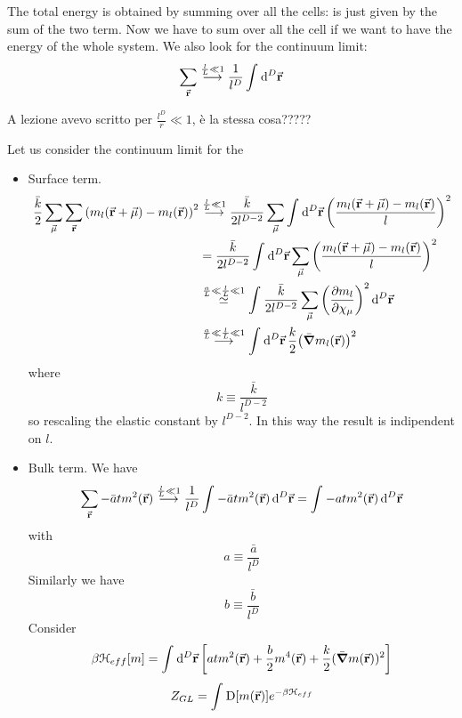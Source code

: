 \documentclass[../main/main.tex]{subfiles}
\begin{document}
The total energy is obtained  by summing over all the cells: is just given by the sum of the two term.
Now we have to sum over all the cell if we want to have the energy of the whole system.
We also look for the continuum limit:
\begin{equation}
  \sum_{\va{r}}^{}  \overset{\frac{l}{L} \ll 1}{\longrightarrow}   \frac{1}{l^D} \int_{}^{} \dd[D]{\va{r}}
\end{equation}
\begin{remark}
A lezione avevo scritto per \( \frac{l^D}{r} \ll 1 \), è la stessa cosa?????
\end{remark}
Let us consider the continuum limit for the
\begin{itemize}
\item Surface term.
\begin{equation}
\begin{split}
\frac{\bar{k} }{2} \sum_{\va{\mu }}^{} \sum_{\va{r}}^{}   \qty(m_l (\va{r}+\va{\mu }) - m_l(\va{r}))^2 &
\overset{\frac{l}{L} \ll 1}{\longrightarrow} \frac{\bar{k} }{2l^{D-2}} \sum_{\va{\mu }}^{} \int_{}^{} \dd[D]{\va{r}} \qty(\frac{m_l (\va{r}+\va{\mu }) - m_l(\va{r})}{l})^2 \\
& = \frac{\bar{k} }{2l^{D-2}} \int_{}^{} \dd[D]{\va{r}} \sum_{\va{\mu }}^{}  \qty(\frac{m_l (\va{r}+\va{\mu }) - m_l(\va{r})}{l})^2 \\
& \overset{\frac{a}{L} \ll \frac{l}{L} \ll 1}{\simeq } \int_{}^{} \frac{\bar{k} }{2l^{D-2}}  \sum_{\va{\mu }}^{} \qty(\pdv{m_l}{\chi _ \mu } )^2   \dd[D]{\va{r}} \\
& \overset{\frac{a}{L} \ll \frac{l}{L} \ll 1}{ \longrightarrow }
\int_{}^{} \dd[D]{\va{r}} \frac{k}{2} \qty(\bar{\grad } m_l (\va{r}) )^2
\end{split}
\end{equation}
where
\begin{equation}
  k \equiv  \frac{ \bar{k} }{l^{D-2}}
\end{equation}
so rescaling the elastic constant by \( l^{D-2} \). In this way the result is indipendent on \( l \).

\item Bulk term.
We have
\begin{equation}
  \sum_{\va{r}}^{} -\bar{a}  t m^2 (\va{r}) \overset{\frac{l}{L} \ll 1}{\longrightarrow}   \frac{1}{l^D} \int_{}^{} -  \bar{a}   t m^2 (\va{r}) \dd[D]{\va{r}}= \int_{}^{} -  a t m^2 (\va{r}) \dd[D]{\va{r}}
\end{equation}
with
\begin{equation}
  a \equiv \frac{\bar{a} }{l^D}
\end{equation}
Similarly we have
\begin{equation}
  b \equiv \frac{\bar{b} }{l^D}
\end{equation}
Consider
\begin{equation}
  \beta \mathcal{H}_{eff} [m] = \int_{}^{} \dd[D]{\va{r}} \qty[a t m^2 (\va{r}) + \frac{b}{2} m^4 (\va{r}) + \frac{k}{2} (\bar{\grad } m (\va{r}))^2]
\end{equation}
\begin{equation}
  Z_{GL} = \int_{}^{} \text{D}\qty[m(\va{r})]   e^{-\beta \mathcal{H}_{eff}}
\end{equation}
\end{itemize}
\end{document}
